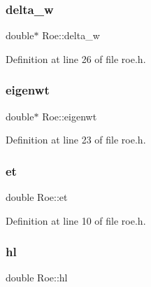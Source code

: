\mbox{\label{classRoe_ae5412109e368776acd7a87eba071a1ae}} 
\subsubsection{\texorpdfstring{delta\+\_\+w}{delta\_w}}
{\footnotesize\ttfamily double$\ast$ Roe\+::delta\+\_\+w\hspace{0.3cm}{\ttfamily [private]}}



Definition at line 26 of file roe.\+h.

\mbox{\label{classRoe_afa7d0be4970f24fb45116dcddadaa5e7}} 
\subsubsection{\texorpdfstring{eigenwt}{eigenwt}}
{\footnotesize\ttfamily double$\ast$ Roe\+::eigenwt\hspace{0.3cm}{\ttfamily [private]}}



Definition at line 23 of file roe.\+h.

\mbox{\label{classRoe_a088ea1d21e7f2a79a833c79de564fe97}} 
\subsubsection{\texorpdfstring{et}{et}}
{\footnotesize\ttfamily double Roe\+::et\hspace{0.3cm}{\ttfamily [private]}}



Definition at line 10 of file roe.\+h.

\mbox{\label{classRoe_abdc3186ec87bc861a4082e6ca41a9d71}} 
\subsubsection{\texorpdfstring{hl}{hl}}
{\footnotesize\ttfamily double Roe\+::hl\hspace{0.3cm}{\ttfamily [private]}}



